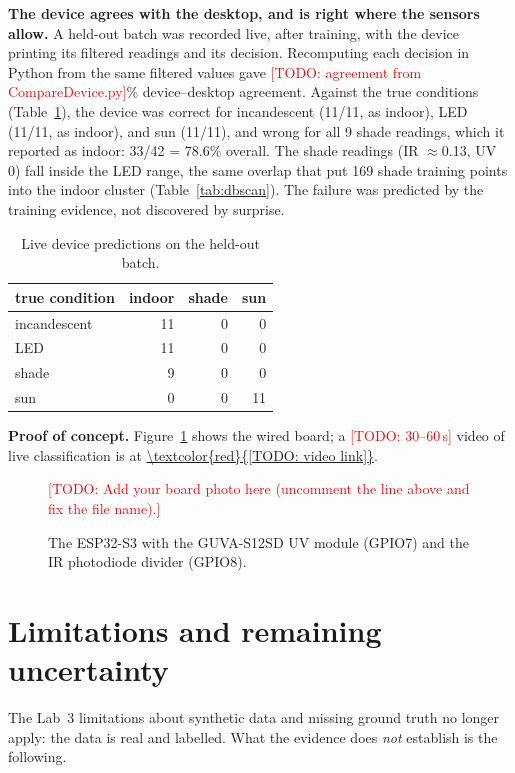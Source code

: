 \documentclass[10pt,a4paper,twocolumn]{article}
\newcommand{\todo}[1]{\textcolor{red}{[TODO: #1]}}
\begin{document}
\textbf{The device agrees with the desktop, and is right where the sensors allow.}
A held-out batch was recorded live, after training, with the device printing its filtered
readings and its decision. Recomputing each decision in Python from the same filtered values
gave \todo{agreement from CompareDevice.py}\% device--desktop agreement. Against the true
conditions (Table~\ref{tab:device}), the device was correct for incandescent (11/11, as
indoor), LED (11/11, as indoor), and sun (11/11), and wrong for all 9 shade readings,
which it reported as indoor: 33/42 = 78.6\% overall. The shade readings (IR $\approx$0.13,
UV 0) fall inside the LED range, the same overlap that put 169 shade training points into
the indoor cluster (Table~\ref{tab:dbscan}). The failure was predicted by the training
evidence, not discovered by surprise.

\begin{table}[!bt]
\centering
\caption{Live device predictions on the held-out batch.}
\label{tab:device}
\begin{tabularx}{\linewidth}{@{}X r r r@{}}
\toprule
true condition & indoor & shade & sun \\
\midrule
incandescent & 11 & 0 & 0 \\
LED & 11 & 0 & 0 \\
shade & 9 & 0 & 0 \\
sun & 0 & 0 & 11 \\
\bottomrule
\end{tabularx}
\end{table}

\textbf{Proof of concept.} Figure~\ref{fig:board} shows the wired board; a
\todo{30--60\,s} video of live classification is at \url{\todo{video link}}.

\begin{figure}[!bt]
\centering
\todo{Add your board photo here (uncomment the line above and fix the file name).}
\caption{The ESP32-S3 with the GUVA-S12SD UV module (GPIO7) and the IR photodiode divider
(GPIO8).}
\label{fig:board}
\end{figure}

\section{Limitations and remaining uncertainty}

The Lab~3 limitations about synthetic data and missing ground truth no longer apply: the
data is real and labelled. What the evidence does \emph{not} establish is the following.
\end{document}
